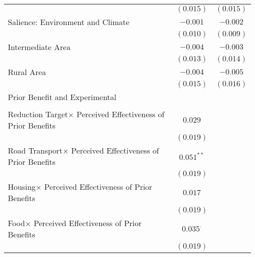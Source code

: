 \begin{center}
\begin{tiny}
\begin{longtable}{l@{} c@{} c@{}}
                                                                           & $(0.015)$       & $(0.015)$      \\
\quad Salience: Environment and Climate                                    & $-0.001$        & $-0.002$       \\
                                                                           & $(0.010)$       & $(0.009)$      \\
\quad Intermediate Area                                                    & $-0.004$        & $-0.003$       \\
                                                                           & $(0.013)$       & $(0.014)$      \\
\quad Rural Area                                                           & $-0.004$        & $-0.005$       \\
                                                                           & $(0.015)$       & $(0.016)$      \\
Prior Benefit and Experimental                                             &                 &                \\
                                                                           &                 &                \\
\quad Reduction Target$\times$ Perceived Effectiveness of Prior Benefits   & $0.029$         &                \\
                                                                           & $(0.019)$       &                \\
\quad Road Transport$\times$ Perceived Effectiveness of Prior Benefits     & $0.051^{**}$    &                \\
                                                                           & $(0.019)$       &                \\
\quad Housing$\times$ Perceived Effectiveness of Prior Benefits            & $0.017$         &                \\
                                                                           & $(0.019)$       &                \\
\quad Food$\times$ Perceived Effectiveness of Prior Benefits               & $0.035^{\cdot}$ &                \\
                                                                           & $(0.019)$       &                \\

\end{longtable}
\end{tiny}
\end{center}
